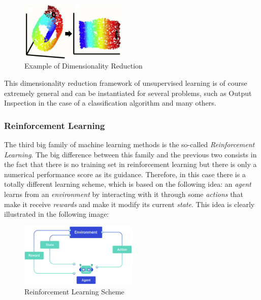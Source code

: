 \begin{itemize}
            \vspace{5mm}

            \begin{figure}[h]
                  \centering
                  \includegraphics[width=0.45\textwidth]{../img/Dim_reduction_example}
                  \caption{Example of Dimensionality Reduction}
            \end{figure}

            \vspace{5mm}

            This dimensionality reduction framework of unsupervised
            learning is of course extremely general and can be
            instantiated for several problems, such as Output Inspection
            in the case of a classification algorithm and many others.
\end{itemize}

\subsubsection{Reinforcement Learning}

The third big family of machine learning methods is the so-called
\emph{Reinforcement Learning}. The big difference between this
family and the previous two consists in the fact that there is no
training set in reinforcement learning but there is only a numerical
performance score as its guidance. Therefore, in this case there is a
totally different learning scheme, which is based on the following idea:
an \emph{agent} learns from an \emph{environment} by interacting with
it through some \emph{actions} that make it receive \emph{rewards}
and make it modify its current \emph{state}. This idea is clearly
illustrated in the following image:

\vspace{2mm}

\begin{figure}[h]
      \centering
      \includegraphics[width=0.5\textwidth]{../img/Reinforcement_learning}
      \caption{Reinforcement Learning Scheme}
\end{figure}

